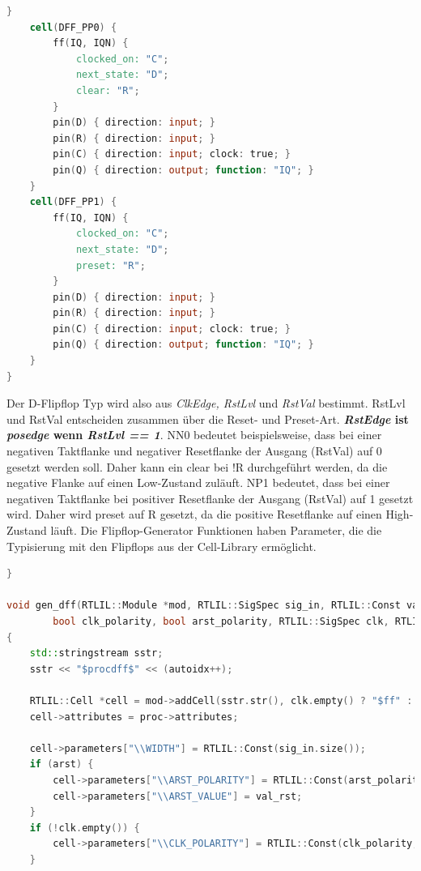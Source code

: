 \documentclass[11pt]{report}
\begin{document}
\begin{enumerate}
\begin{lstlisting}[language=Verilog]
	}
	cell(DFF_PP0) {
		ff(IQ, IQN) {
			clocked_on: "C";
			next_state: "D";
			clear: "R";
		}
		pin(D) { direction: input; }
		pin(R) { direction: input; }
		pin(C) { direction: input; clock: true; }
		pin(Q) { direction: output; function: "IQ"; }
	}
	cell(DFF_PP1) {
		ff(IQ, IQN) {
			clocked_on: "C";
			next_state: "D";
			preset: "R";
		}
		pin(D) { direction: input; }
		pin(R) { direction: input; }
		pin(C) { direction: input; clock: true; }
		pin(Q) { direction: output; function: "IQ"; }
	}
}
\end{lstlisting}
Der D-Flipflop Typ wird also aus \textit{ClkEdge, RstLvl} und \textit{RstVal} bestimmt.
RstLvl und RstVal entscheiden zusammen über die Reset- und Preset-Art.
\textbf{\textit{RstEdge} ist \textit{posedge} wenn \textit{RstLvl == 1}}.
NN0 bedeutet beispielsweise, dass bei einer negativen Taktflanke und negativer Resetflanke der Ausgang (RstVal) auf 0 gesetzt werden soll.
Daher kann ein clear bei !R durchgeführt werden, da die negative Flanke auf einen Low-Zustand zuläuft.
NP1 bedeutet, dass bei einer negativen Taktflanke bei positiver Resetflanke der Ausgang (RstVal) auf 1 gesetzt wird. Daher wird preset auf R gesetzt, da die positive Resetflanke auf einen High-Zustand läuft.
Die Flipflop-Generator Funktionen haben Parameter, die die Typisierung mit den Flipflops aus der Cell-Library ermöglicht.
\begin{lstlisting}[language=C++]
}

void gen_dff(RTLIL::Module *mod, RTLIL::SigSpec sig_in, RTLIL::Const val_rst, RTLIL::SigSpec sig_out,
		bool clk_polarity, bool arst_polarity, RTLIL::SigSpec clk, RTLIL::SigSpec *arst, RTLIL::Process *proc)
{
	std::stringstream sstr;
	sstr << "$procdff$" << (autoidx++);

	RTLIL::Cell *cell = mod->addCell(sstr.str(), clk.empty() ? "$ff" : arst ? "$adff" : "$dff");
	cell->attributes = proc->attributes;

	cell->parameters["\\WIDTH"] = RTLIL::Const(sig_in.size());
	if (arst) {
		cell->parameters["\\ARST_POLARITY"] = RTLIL::Const(arst_polarity, 1);
		cell->parameters["\\ARST_VALUE"] = val_rst;
	}
	if (!clk.empty()) {
		cell->parameters["\\CLK_POLARITY"] = RTLIL::Const(clk_polarity, 1);
	}


\end{lstlisting}
\end{enumerate}
\end{document}

